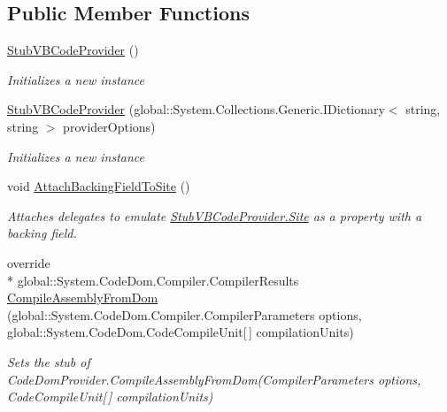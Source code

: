 \subsection*{Public Member Functions}
\begin{DoxyCompactItemize}
\item 
\hyperlink{class_microsoft_1_1_visual_basic_1_1_fakes_1_1_stub_v_b_code_provider_a4b160c30d45132de021cc2bca1aeb07d}{Stub\-V\-B\-Code\-Provider} ()
\begin{DoxyCompactList}\small\item\em Initializes a new instance\end{DoxyCompactList}\item 
\hyperlink{class_microsoft_1_1_visual_basic_1_1_fakes_1_1_stub_v_b_code_provider_aff8b56b4711022adb8119dc3afe875b7}{Stub\-V\-B\-Code\-Provider} (global\-::\-System.\-Collections.\-Generic.\-I\-Dictionary$<$ string, string $>$ provider\-Options)
\begin{DoxyCompactList}\small\item\em Initializes a new instance\end{DoxyCompactList}\item 
void \hyperlink{class_microsoft_1_1_visual_basic_1_1_fakes_1_1_stub_v_b_code_provider_a296f3e39dc0709fb488ff0bd48dd5b0d}{Attach\-Backing\-Field\-To\-Site} ()
\begin{DoxyCompactList}\small\item\em Attaches delegates to emulate \hyperlink{class_microsoft_1_1_visual_basic_1_1_fakes_1_1_stub_v_b_code_provider_a75e5c8469c906665058f0ffc4a241e16}{Stub\-V\-B\-Code\-Provider.\-Site} as a property with a backing field.\end{DoxyCompactList}\item 
override \\*
global\-::\-System.\-Code\-Dom.\-Compiler.\-Compiler\-Results \hyperlink{class_microsoft_1_1_visual_basic_1_1_fakes_1_1_stub_v_b_code_provider_a8fb7dcddc0eb2cf3efba47459895aec6}{Compile\-Assembly\-From\-Dom} (global\-::\-System.\-Code\-Dom.\-Compiler.\-Compiler\-Parameters options, global\-::\-System.\-Code\-Dom.\-Code\-Compile\-Unit\mbox{[}$\,$\mbox{]} compilation\-Units)
\begin{DoxyCompactList}\small\item\em Sets the stub of Code\-Dom\-Provider.\-Compile\-Assembly\-From\-Dom(\-Compiler\-Parameters options, Code\-Compile\-Unit\mbox{[}$\,$\mbox{]} compilation\-Units)\end{DoxyCompactList}\item 

\end{DoxyCompactItemize}
